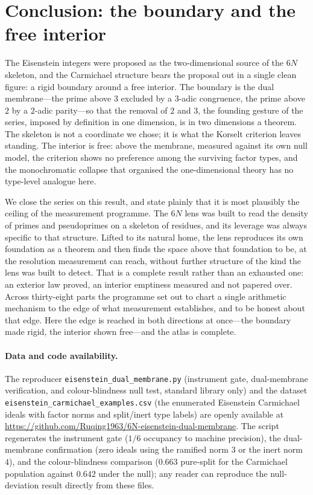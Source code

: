\documentclass[11pt]{article}
\begin{document}
\section{Conclusion: the boundary and the free interior}\label{sec:conc}
The Eisenstein integers were proposed as the two-dimensional source of the $6N$ skeleton, and the
Carmichael structure bears the proposal out in a single clean figure: a rigid boundary around a free
interior. The boundary is the dual membrane---the prime above $3$ excluded by a $3$-adic congruence,
the prime above $2$ by a $2$-adic parity---so that the removal of $2$ and $3$, the founding gesture of
the series, imposed by definition in one dimension, is in two dimensions a theorem. The skeleton is not
a coordinate we chose; it is what the Korselt criterion leaves standing. The interior is free: above the
membrane, measured against its own null model, the criterion shows no preference among the surviving
factor types, and the monochromatic collapse that organised the one-dimensional theory has no
type-level analogue here.

We close the series on this result, and state plainly that it is most plausibly the ceiling of the
measurement programme. The $6N$ lens was built to read the density of primes and pseudoprimes on a
skeleton of residues, and its leverage was always specific to that structure. Lifted to its natural
home, the lens reproduces its own foundation as a theorem and then finds the space above that
foundation to be, at the resolution measurement can reach, without further structure of the kind the
lens was built to detect. That is a complete result rather than an exhausted one: an exterior law
proved, an interior emptiness measured and not papered over. Across thirty-eight parts the programme set
out to chart a single arithmetic mechanism to the edge of what measurement establishes, and to be
honest about that edge. Here the edge is reached in both directions at once---the boundary made rigid,
the interior shown free---and the atlas is complete.

\paragraph{Data and code availability.}
The reproducer \texttt{eisenstein\_dual\_membrane.py} (instrument gate, dual-membrane verification, and
colour-blindness null test, standard library only) and the dataset
\texttt{eisenstein\_carmichael\_examples.csv} (the enumerated Eisenstein Carmichael ideals with factor
norms and split/inert type labels) are openly available at
\url{https://github.com/Ruqing1963/6N-eisenstein-dual-membrane}. The
script regenerates the instrument gate ($1/6$ occupancy to machine precision), the dual-membrane
confirmation (zero ideals using the ramified norm $3$ or the inert norm $4$), and the colour-blindness
comparison ($0.663$ pure-split for the Carmichael population against $0.642$ under the null); any reader
can reproduce the null-deviation result directly from these files.
\end{document}

